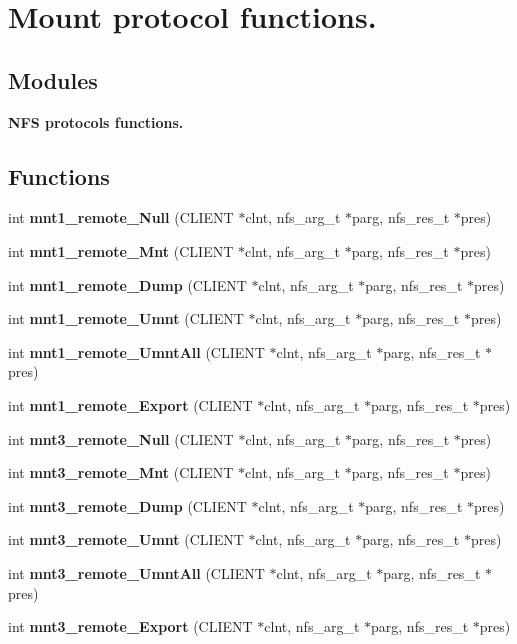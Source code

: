 \section{Mount protocol functions.}
\label{group__MNTprocs}
\subsection*{Modules}
\begin{DoxyCompactItemize}
\item 
{\bf NFS protocols functions.}
\end{DoxyCompactItemize}
\subsection*{Functions}
\begin{DoxyCompactItemize}
\item 
int {\bf mnt1\_\-remote\_\-Null} (CLIENT $\ast$clnt, nfs\_\-arg\_\-t $\ast$parg, nfs\_\-res\_\-t $\ast$pres)
\item 
int {\bf mnt1\_\-remote\_\-Mnt} (CLIENT $\ast$clnt, nfs\_\-arg\_\-t $\ast$parg, nfs\_\-res\_\-t $\ast$pres)
\item 
int {\bf mnt1\_\-remote\_\-Dump} (CLIENT $\ast$clnt, nfs\_\-arg\_\-t $\ast$parg, nfs\_\-res\_\-t $\ast$pres)
\item 
int {\bf mnt1\_\-remote\_\-Umnt} (CLIENT $\ast$clnt, nfs\_\-arg\_\-t $\ast$parg, nfs\_\-res\_\-t $\ast$pres)
\item 
int {\bf mnt1\_\-remote\_\-UmntAll} (CLIENT $\ast$clnt, nfs\_\-arg\_\-t $\ast$parg, nfs\_\-res\_\-t $\ast$pres)
\item 
int {\bf mnt1\_\-remote\_\-Export} (CLIENT $\ast$clnt, nfs\_\-arg\_\-t $\ast$parg, nfs\_\-res\_\-t $\ast$pres)
\item 
int {\bf mnt3\_\-remote\_\-Null} (CLIENT $\ast$clnt, nfs\_\-arg\_\-t $\ast$parg, nfs\_\-res\_\-t $\ast$pres)
\item 
int {\bf mnt3\_\-remote\_\-Mnt} (CLIENT $\ast$clnt, nfs\_\-arg\_\-t $\ast$parg, nfs\_\-res\_\-t $\ast$pres)
\item 
int {\bf mnt3\_\-remote\_\-Dump} (CLIENT $\ast$clnt, nfs\_\-arg\_\-t $\ast$parg, nfs\_\-res\_\-t $\ast$pres)
\item 
int {\bf mnt3\_\-remote\_\-Umnt} (CLIENT $\ast$clnt, nfs\_\-arg\_\-t $\ast$parg, nfs\_\-res\_\-t $\ast$pres)
\item 
int {\bf mnt3\_\-remote\_\-UmntAll} (CLIENT $\ast$clnt, nfs\_\-arg\_\-t $\ast$parg, nfs\_\-res\_\-t $\ast$pres)
\item 
int {\bf mnt3\_\-remote\_\-Export} (CLIENT $\ast$clnt, nfs\_\-arg\_\-t $\ast$parg, nfs\_\-res\_\-t $\ast$pres)
\end{DoxyCompactItemize}


